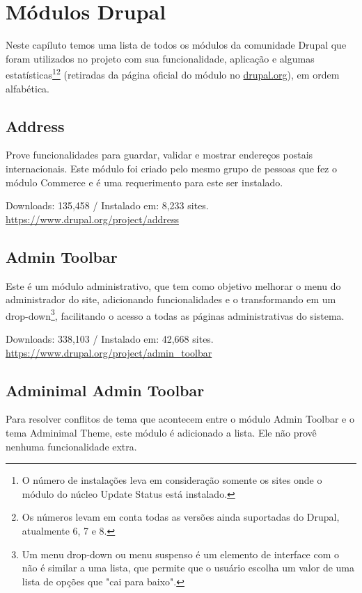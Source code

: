 \chapter{Módulos Drupal}

Neste capíluto temos uma lista de todos os módulos da comunidade Drupal que foram utilizados no projeto com sua funcionalidade, aplicação e algumas estatísticas\footnote{O número de instalações leva em consideração somente os sites onde o módulo do núcleo Update Status está instalado.}\footnote{Os números levam em conta todas as versões ainda suportadas do Drupal, atualmente 6, 7 e 8.} (retiradas da página oficial do módulo no \url{drupal.org}), em ordem alfabética.

\section{Address}
Prove funcionalidades para guardar, validar e mostrar endereços postais internacionais.
Este módulo foi criado pelo mesmo grupo de pessoas que fez o módulo Commerce e é uma requerimento para este ser instalado.

\begin{center}
  Downloads: 135,458 / Instalado em: 8,233 sites.
  \url{https://www.drupal.org/project/address}
\end{center}

\section{Admin Toolbar}
Este é um módulo administrativo, que tem como objetivo melhorar o menu do administrador do site, adicionando funcionalidades e o transformando em um drop-down\footnote{Um menu drop-down ou menu suspenso é um elemento de interface com o não é similar a uma lista, que permite que o usuário escolha um valor de uma lista de opções que "cai para baixo".}, facilitando o acesso a todas as páginas administrativas do sistema.

\begin{center}
  Downloads: 338,103 / Instalado em: 42,668 sites.
  \url{https://www.drupal.org/project/admin_toolbar}
\end{center}

\section{Adminimal Admin Toolbar}
Para resolver conflitos de tema que acontecem entre o módulo Admin Toolbar e o tema Adminimal Theme, este módulo é adicionado a lista. Ele não provê nenhuma funcionalidade extra.

